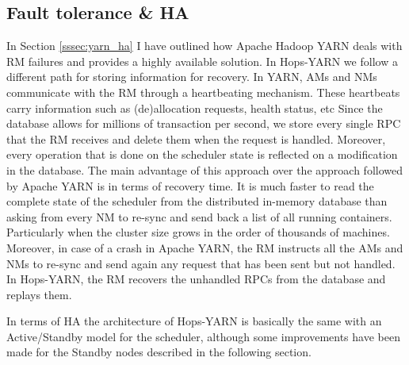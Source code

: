 \subsection{Fault tolerance \& HA}
\label{ssec:hopsyarn_fault_tol_ha}
In Section \ref{sssec:yarn_ha} I have outlined how Apache Hadoop YARN
deals with RM failures and provides a highly available solution. In
Hops-YARN we follow a different path for storing information for
recovery. In YARN, AMs and NMs communicate with the RM through a
heartbeating mechanism. These heartbeats carry information such as
(de)allocation requests, health status, etc Since the database allows
for millions of transaction per second, we store every single RPC that
the RM receives and delete them when the request is handled. Moreover,
every operation that is done on the scheduler state is reflected on a
modification in the database. The main advantage of this approach over
the approach followed by Apache YARN is in terms of recovery
time. It is much faster to read the complete state of the scheduler from the
distributed in-memory database than asking from every NM to re-sync
and send back a list of all running containers. Particularly when
the cluster size grows in the order of thousands of
machines. Moreover, in case of a crash in Apache YARN, the RM
instructs all the AMs and NMs to re-sync and send again any request
that has been sent but not handled. In Hops-YARN, the RM recovers the
unhandled RPCs from the database and replays them.

In terms of HA the architecture of Hops-YARN is basically the same
with an Active/Standby model for the scheduler, although some
improvements have been made for the Standby nodes described in the
following section.

